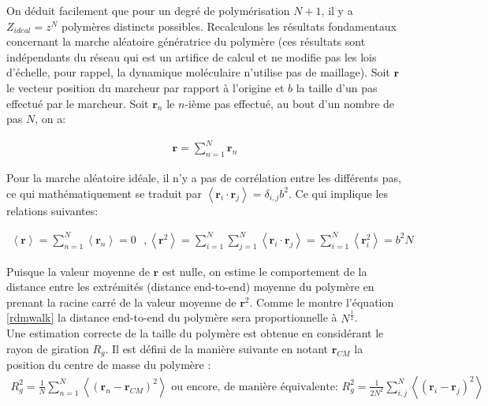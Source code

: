 \documentclass[a4paper,11pt]{article}
\begin{document}
On déduit facilement que pour un degré de polymérisation $N+1$, il y a $Z_{ideal}=z^N$ polymères distincts possibles. Recalculons les résultats fondamentaux concernant la marche aléatoire génératrice du polymère (ces résultats sont indépendants du réseau qui est un artifice de calcul et ne modifie pas les lois d'échelle, pour rappel, la dynamique moléculaire n'utilise pas de maillage). Soit $\textbf{r}$ le vecteur position du marcheur par rapport à l'origine et $b$ la taille d'un pas effectué par le marcheur. Soit $\textbf{r}_n$ le $n$-ième pas effectué, au bout d'un nombre de pas $N$, on a: 

\begin{eqnarray}
\textbf{r} = \sum_{n = 1}^{N} \textbf{r}_n
\end{eqnarray}

Pour la marche aléatoire idéale, il n'y a pas de corrélation entre les différents pas, ce qui mathématiquement se traduit par $\left<\textbf{r}_i \cdot \textbf{r}_j\right> = \delta_{i,j} b^2$. Ce qui implique les relations suivantes:

\begin{eqnarray}
\left<\textbf{r}\right>\text{} = \sum_{n = 1}^{N} \left<\textbf{r}_n \right>\text{} =\text{} 0 \text{ }, \text{} \left<\textbf{r}^2\right> \text{}= \sum_{i = 1}^{N} \sum_{j = 1}^{N} \left<\textbf{r}_i \cdot \textbf{r}_j\right> \text{}= \sum_{i = 1}^{N} \left<\textbf{r}_i^2\right> \text{}= b^2 N
\label{rdmwalk}
\end{eqnarray}

 Puisque la valeur moyenne de $\textbf{r}$ est nulle, on estime le comportement de la distance entre les extrémités (distance end-to-end) moyenne du polymère en prenant la racine carré de la valeur moyenne de $\textbf{r}^2$. Comme le montre l'équation \ref{rdmwalk} la distance end-to-end du polymère sera proportionnelle à $N^\frac{1}{2}$.\\
 
 Une estimation correcte de la taille du polymère est obtenue en considérant le rayon de giration $R_g$. Il est défini de la manière suivante en notant $\textbf{r}_{CM}$ la position du centre de masse du polymère :
 \begin{eqnarray}
R_g^2\text{}=\text{}\frac{1}{N}\sum_{n = 1}^{N} \left<(\textbf{r}_n-\textbf{r}_{CM})^2\right>
 \text{ ou encore, de manière équivalente: }
R_g^2\text{}=\text{}\frac{1}{2N^2}\sum_{i,j}^N \left<(\textbf{r}_i-\textbf{r}_{j})^2\right>
\label{equ}
\end{eqnarray}
 
\end{document}
